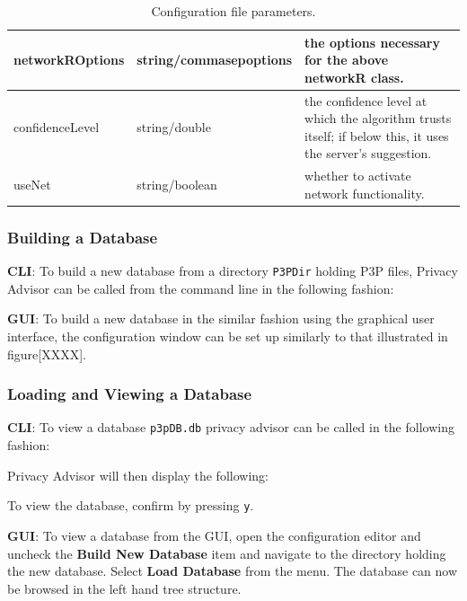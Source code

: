 \begin{center}
\begin{table}[h!]
\begin{tabular} { | l | l | p{7cm} | }
      networkROptions & string/commasepoptions	& the options necessary for the above networkR class. \\ \hline
      confidenceLevel & string/double & the confidence level at which the algorithm trusts itself; if below this, it uses the server's suggestion. \\ \hline
      useNet & string/boolean & whether to activate network functionality. \\ \hline
      \hline
    \end{tabular}
    \caption{Configuration file parameters.}
  \end{table}
\end{center}

\subsubsection{Building a Database}

\textbf{CLI}: To build a new database from a directory \texttt{P3PDir} holding P3P files, Privacy
Advisor can be called from the command line in the following fashion:


\textbf{GUI}: To build a new database in the similar fashion using the
graphical user interface, the configuration window can be set up
similarly to that illustrated in figure[XXXX].

\subsubsection{Loading and Viewing a Database}

\textbf{CLI}: To view a database \texttt{p3pDB.db} privacy advisor can be called in the following fashion:


Privacy Advisor will then display the following:


To view the database, confirm by pressing \texttt{y}.

\textbf{GUI}: To view a database from the GUI, open the configuration editor and uncheck the \textbf{Build New Database} item and 
navigate to the directory holding the new database. Select \textbf{Load Database} from the menu. The database can now be browsed in
the left hand tree structure.


